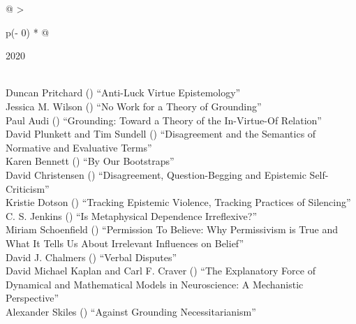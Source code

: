\documentclass[
  10pt,
  letterpaper,
  DIV=11,
  numbers=noendperiod,
  twoside]{scrartcl}
\begin{document}
\begin{longtable}[]{@{}
  >{\raggedright\arraybackslash}p{(\columnwidth - 0\tabcolsep) * }@{}}

\caption{\label{tbl-top-ten-2011}Most cited articles published less than
ten years ago as of 2020.}

\tabularnewline

\toprule\noalign{}
\begin{minipage}[b]{\linewidth}\raggedright
2020
\end{minipage} \\
\midrule\noalign{}
\endhead
\bottomrule\noalign{}
\endlastfoot
Duncan Pritchard
()
``Anti-Luck Virtue Epistemology'' \\
Jessica M. Wilson
()
``No Work for a Theory of Grounding'' \\
Paul Audi
()
``Grounding: Toward a Theory of the In-Virtue-Of Relation'' \\
David Plunkett and Tim Sundell
()
``Disagreement and the Semantics of Normative and Evaluative Terms'' \\
Karen Bennett
()
``By Our Bootstraps'' \\
David Christensen
()
``Disagreement, Question-Begging and Epistemic Self-Criticism'' \\
Kristie Dotson
()
``Tracking Epistemic Violence, Tracking Practices of Silencing'' \\
C. S. Jenkins
()
``Is Metaphysical Dependence Irreflexive?'' \\
Miriam Schoenfield
()
``Permission To Believe: Why Permissivism is True and What It Tells Us
About Irrelevant Influences on Belief'' \\
David J. Chalmers
()
``Verbal Disputes'' \\
David Michael Kaplan and Carl F. Craver
()
``The Explanatory Force of Dynamical and Mathematical Models in
Neuroscience: A Mechanistic Perspective'' \\
Alexander Skiles
()
``Against Grounding Necessitarianism'' \\

\end{longtable}
\end{document}
